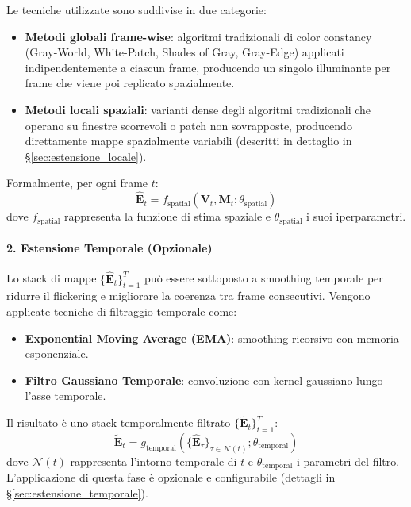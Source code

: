 Le tecniche utilizzate sono suddivise in due categorie:
\begin{itemize}
    \item \textbf{Metodi globali frame-wise}: algoritmi tradizionali di color constancy (Gray-World, White-Patch, Shades of Gray, Gray-Edge) applicati indipendentemente a ciascun frame, producendo un singolo illuminante per frame che viene poi replicato spazialmente.
    \item \textbf{Metodi locali spaziali}: varianti dense degli algoritmi tradizionali che operano su finestre scorrevoli o patch non sovrapposte, producendo direttamente mappe spazialmente variabili (descritti in dettaglio in \S\ref{sec:estensione_locale}).
\end{itemize}

Formalmente, per ogni frame $t$:
\begin{equation}
    \hat{\mathbf{E}}_t = f_{\text{spatial}}(\mathbf{V}_t, \mathbf{M}_t; \theta_{\text{spatial}})
    \label{eq:spatial_estimation}
\end{equation}
dove $f_{\text{spatial}}$ rappresenta la funzione di stima spaziale e $\theta_{\text{spatial}}$ i suoi iperparametri.

\paragraph{2. Estensione Temporale (Opzionale)}
Lo stack di mappe $\{\hat{\mathbf{E}}_t\}_{t=1}^T$ può essere sottoposto a smoothing temporale per ridurre il flickering e migliorare la coerenza tra frame consecutivi. Vengono applicate tecniche di filtraggio temporale come:
\begin{itemize}
    \item \textbf{Exponential Moving Average (EMA)}: smoothing ricorsivo con memoria esponenziale.
    \item \textbf{Filtro Gaussiano Temporale}: convoluzione con kernel gaussiano lungo l'asse temporale.
\end{itemize}

Il risultato è uno stack temporalmente filtrato $\{\tilde{\mathbf{E}}_t\}_{t=1}^T$:
\begin{equation}
    \tilde{\mathbf{E}}_t = g_{\text{temporal}}(\{\hat{\mathbf{E}}_\tau\}_{\tau \in \mathcal{N}(t)}; \theta_{\text{temporal}})
    \label{eq:temporal_filtering}
\end{equation}
dove $\mathcal{N}(t)$ rappresenta l'intorno temporale di $t$ e $\theta_{\text{temporal}}$ i parametri del filtro. L'applicazione di questa fase è opzionale e configurabile (dettagli in \S\ref{sec:estensione_temporale}).

